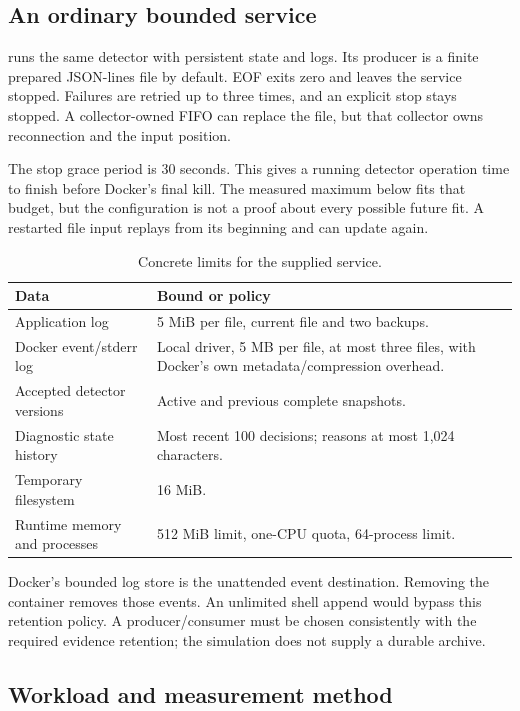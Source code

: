 \subsection{An ordinary bounded service}

 runs the same detector with persistent state and logs.
Its producer is a finite prepared JSON-lines file by default. EOF exits zero
and leaves the service stopped. Failures are retried up to three times, and an
explicit stop stays stopped. A collector-owned FIFO can replace the file, but
that collector owns reconnection and the input position.

The stop grace period is 30 seconds. This gives a running detector operation
time to finish before Docker's final kill. The measured maximum below fits that
budget, but the configuration is not a proof about every possible future fit.
A restarted file input replays from its beginning and can update again.

\begin{table}[H]
\centering\small
\begin{tabularx}{\textwidth}{>{\raggedright\arraybackslash}p{}X}
\toprule\textbf{Data} & \textbf{Bound or policy} \\
\midrule
Application log & 5 MiB per file, current file and two backups. \\
Docker event/stderr log & Local driver, 5 MB per file, at most three files,
with Docker's own metadata/compression overhead. \\
Accepted detector versions & Active and previous complete snapshots. \\
Diagnostic state history & Most recent 100 decisions; reasons at most
1,024 characters. \\
Temporary filesystem & 16 MiB. \\
Runtime memory and processes & 512 MiB limit, one-CPU quota, 64-process limit. \\
\bottomrule
\end{tabularx}
\caption{Concrete limits for the supplied service.}
\end{table}

Docker's bounded log store is the unattended event destination. Removing the
container removes those events. An unlimited shell append would bypass this
retention policy. A producer/consumer must be chosen consistently with the
required evidence retention; the simulation does not supply a durable archive.

\subsection{Workload and measurement method}

